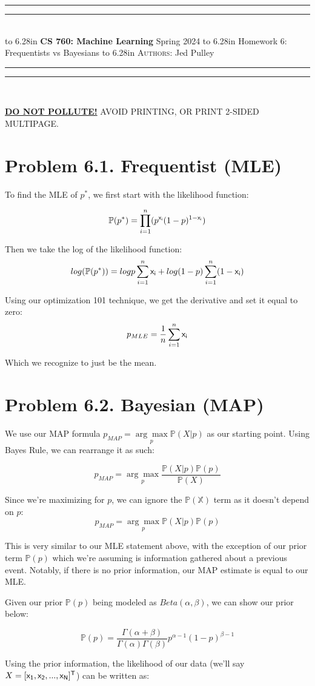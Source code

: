 \documentclass{article}
\newcommand{\lecture}[2]{
\pagestyle{myheadings}
\thispagestyle{plain}
\newpage
\noindent
\begin{center}
\rule{\textwidth}{1.6pt}\vspace*{-\baselineskip}\vspace*{2pt} %
\rule{\textwidth}{0.4pt}\\[1\baselineskip] %
\vbox{\vspace{2mm}
\hbox to 6.28in { {\bf CS 760: Machine Learning} \hfill Spring 2024 }
\vspace{4mm}
\hbox to 6.28in { {\Large \hfill #1  \hfill} }
\vspace{4mm}
\hbox to 6.28in { {\scshape Authors:}  #2 \hfill }}
\vspace{-2mm}
\rule{\textwidth}{0.4pt}\vspace*{-\baselineskip}\vspace{3.2pt} %
\rule{\textwidth}{1.6pt}\\[\baselineskip] %
\end{center}
\vspace*{4mm}
}
\begin{document}
\lecture{Homework 6: Frequentists vs Bayesians}{Jed Pulley}

\begin{center}
{\Large {\sf \underline{\textbf{DO NOT POLLUTE!}} AVOID PRINTING, OR PRINT 2-SIDED MULTIPAGE.}}
\end{center}

\section*{Problem 6.1. Frequentist (MLE)}
To find the MLE of $p^*$, we first start with the likelihood function:

  \[\mathbb{P}(p^*) = \prod^n_{i=1} (p^{\sf{x}_i} (1 - p)^{1 - \sf{x}_i})\]

Then we take the log of the likelihood function:
  \[ log(\mathbb{P}(p^*)) = logp \sum_{i=1}^{n} {\sf{x}_i} + log (1 - p) \sum_{i=1}^{n}(1 - {\sf{x}_i}) \]

Using our optimization 101 technique, we get the derivative and set it equal to zero:
  \[ p_{MLE} = \frac{1}{n} \sum_{i=1}^{n} \sf{x}_i \]

Which we recognize to just be the mean.

\section*{Problem 6.2. Bayesian (MAP)}
We use our MAP formula $p_{MAP} = \underset{p}{\arg\max} \mathbb{P}(X | p)$ as our starting point. Using Bayes Rule, we can rearrange it as such:

\[ p_{MAP} = \underset{p}{\arg\max} \frac{\mathbb{P}(X | p) \mathbb{P}(p)}{\mathbb{P}(X)} \]

Since we're maximizing for $p$, we can ignore the $\mathbb{P(X)}$ term as it doesn't depend on $p$:
\[ p_{MAP} = \underset{p}{\arg\max} \mathbb{P}(X | p) \mathbb{P}(p)\]

This is very similar to our MLE statement above, with the exception of our prior term $\mathbb{P}(p)$ which we're assuming is information gathered about a previous event. Notably, if there is no prior information, our MAP estimate is equal to our MLE.

Given our prior $\mathbb{P}(p)$ being modeled as $Beta(\alpha, \beta)$, we can show our prior below:

\[ \mathbb{P}(p) = \frac{\Gamma(\alpha + \beta)}{\Gamma(\alpha)\Gamma(\beta)}p^{\alpha - 1}(1 - p)^{\beta - 1} \]

Using the prior information, the likelihood of our data (we'll say $X = [\sf{x}_1, \sf{x}_2, ..., \sf{x}_N]^{\sf{T}}$) can be written as:
\end{document}
